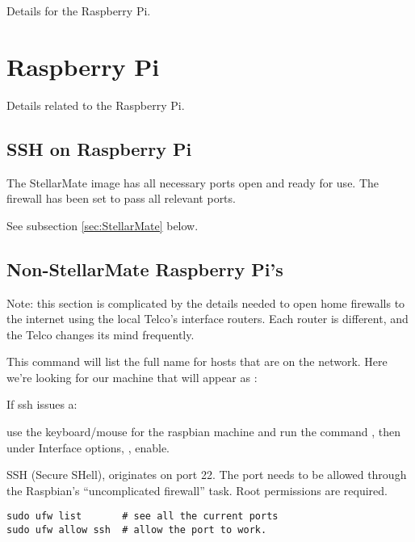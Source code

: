 
Details for the Raspberry Pi.

\newpage
\section{Raspberry Pi}

Details related to the Raspberry Pi.


\subsection{SSH on Raspberry Pi}

The StellarMate image has all necessary ports open and ready for use.
The firewall has been set to pass all relevant ports.

See subsection \ref{sec:StellarMate} below.

\subsection{Non-StellarMate Raspberry Pi's}

Note: this section is complicated by the details needed to open
home firewalls to the internet using the local Telco's interface
routers. Each router is different, and the Telco changes its mind
frequently.

This command will list the full name for hosts that are on the network.
Here we're looking for our machine  that will appear
as :

{}

If ssh issues a:


use the keyboard/mouse for the raspbian machine and run the command
, then under Interface options,  , enable.


SSH (Secure SHell), originates on port 22. The port needs to be allowed
through the Raspbian's ``uncomplicated firewall''  task. Root
permissions are required.

\begingroup \fontsize{10pt}{10pt}
\selectfont
\begin{verbatim} 
sudo ufw list       # see all the current ports
sudo ufw allow ssh  # allow the port to work.
\end{verbatim}
\endgroup

